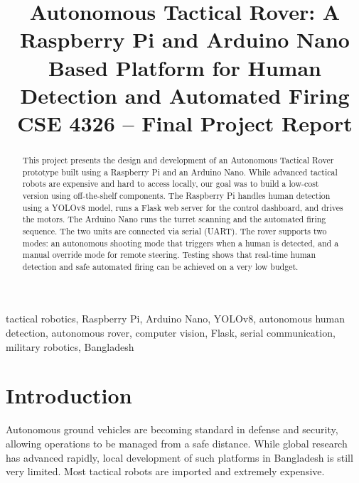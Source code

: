 \documentclass[conference]{IEEEtran}
\begin{document}
\title{Autonomous Tactical Rover: A Raspberry Pi and Arduino Nano Based Platform for Human Detection and Automated Firing\\
\large{CSE 4326 -- Final Project Report}}

\author{
\and
{}
\and
{}
\and
{}
\and
{}
}

\maketitle

\begin{abstract}
This project presents the design and development of an Autonomous Tactical Rover prototype built using a Raspberry Pi and an Arduino Nano. While advanced tactical robots are expensive and hard to access locally, our goal was to build a low-cost version using off-the-shelf components. The Raspberry Pi handles human detection using a YOLOv8 model, runs a Flask web server for the control dashboard, and drives the motors. The Arduino Nano runs the turret scanning and the automated firing sequence. The two units are connected via serial (UART). The rover supports two modes: an autonomous shooting mode that triggers when a human is detected, and a manual override mode for remote steering. Testing shows that real-time human detection and safe automated firing can be achieved on a very low budget.
\end{abstract}

\begin{IEEEkeywords}
tactical robotics, Raspberry Pi, Arduino Nano, YOLOv8, autonomous human detection, autonomous rover, computer vision, Flask, serial communication, military robotics, Bangladesh
\end{IEEEkeywords}

\section{Introduction}
Autonomous ground vehicles are becoming standard in defense and security, allowing operations to be managed from a safe distance. While global research has advanced rapidly, local development of such platforms in Bangladesh is still very limited. Most tactical robots are imported and extremely expensive. 
\end{document}

